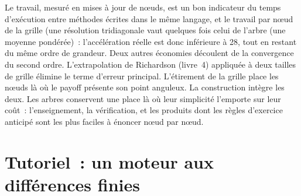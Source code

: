 Le travail, mesuré en mises à jour de nœuds, est un bon indicateur du temps d'exécution entre méthodes écrites dans le même langage, et le travail par nœud de la grille (une résolution tridiagonale
vaut quelques fois celui de l'arbre (une moyenne pondérée)~: l'accélération réelle est donc inférieure à 28, tout en restant du même ordre de grandeur. Deux autres économies
découlent de la convergence du second ordre. L'extrapolation de Richardson (livre~4) appliquée à deux tailles de grille élimine le terme d'erreur principal. L'étirement de la grille place les
nœuds là où le payoff présente son point anguleux. La construction intègre les deux. Les arbres conservent une place là où leur simplicité l'emporte sur leur coût~: l'enseignement,
la vérification, et les produits dont les règles d'exercice anticipé sont les plus faciles à énoncer nœud par nœud.

\section{Tutoriel~: un moteur aux différences finies}\label{tut:dv:trees-and-finite-difference-pricers-in-practice:tut}

